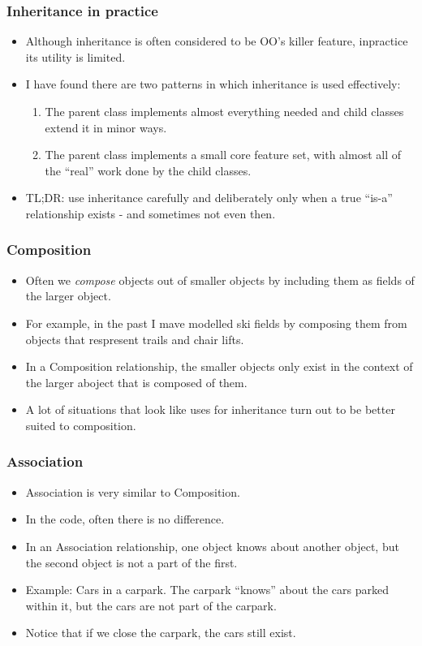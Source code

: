 \documentclass[10pt]{beamer}
\begin{document}
\begin{frame}
	\frametitle{Inheritance in practice}
	\begin{itemize}
		\item Although inheritance is often considered to be OO's
			killer feature, inpractice its utility is limited.
		\item I have found there are two patterns in which inheritance is 
			used effectively:
			\begin{enumerate}
				\item The parent class implements almost everything needed
					and child classes extend it in minor ways.
				\item The parent class implements a small core feature set,
					with almost all of the ``real'' work done by the child classes.
			\end{enumerate}
		\item TL;DR: use inheritance carefully and deliberately only when a true ``is-a'' 
			relationship exists - and sometimes not even then.
	\end{itemize}
\end{frame}
\begin{frame}
	\frametitle{Composition}
	\begin{itemize}
		\item Often we \emph{compose} objects out of smaller
			objects by including them as fields of the larger object.
		\item For example, in the past I mave modelled ski fields by composing them 
			from objects that respresent trails and chair lifts.
		\item In a Composition relationship, the smaller objects only exist in 
			the context of the larger aboject that is composed of them.
		\item A lot of situations that look like uses for inheritance turn out 
			to be better suited to composition.
	\end{itemize}
\end{frame}
\begin{frame}
	\frametitle{Association}
	\begin{itemize}
		\item Association is very similar to Composition.  
		\item In the code, often there is no difference.
		\item In an Association relationship, one object 
			knows about another object, but the second object is not a 
			part of the first.
		\item Example: Cars in a carpark.  The carpark ``knows'' about
			the cars parked within it, but the cars are not part of the 
			carpark.
		\item Notice that if we close the carpark, the cars still exist.
        \end{itemize}
\end{frame}
\end{document}
